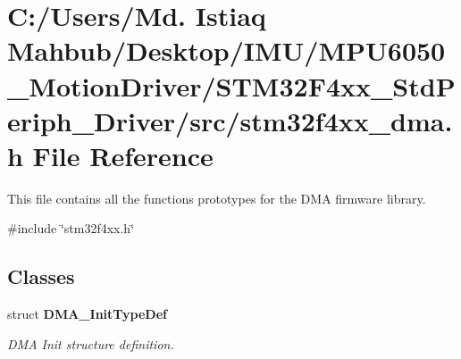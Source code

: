 \section{C\+:/\+Users/\+Md. Istiaq Mahbub/\+Desktop/\+I\+M\+U/\+M\+P\+U6050\+\_\+\+Motion\+Driver/\+S\+T\+M32\+F4xx\+\_\+\+Std\+Periph\+\_\+\+Driver/src/stm32f4xx\+\_\+dma.h File Reference}
\label{stm32f4xx__dma_8h}


This file contains all the functions prototypes for the D\+MA firmware library.  


{\ttfamily \#include \char`\"{}stm32f4xx.\+h\char`\"{}}\newline
\subsection*{Classes}
\begin{DoxyCompactItemize}
\item 
struct \textbf{ D\+M\+A\+\_\+\+Init\+Type\+Def}
\begin{DoxyCompactList}\small\item\em D\+MA Init structure definition. \end{DoxyCompactList}\end{DoxyCompactItemize}
